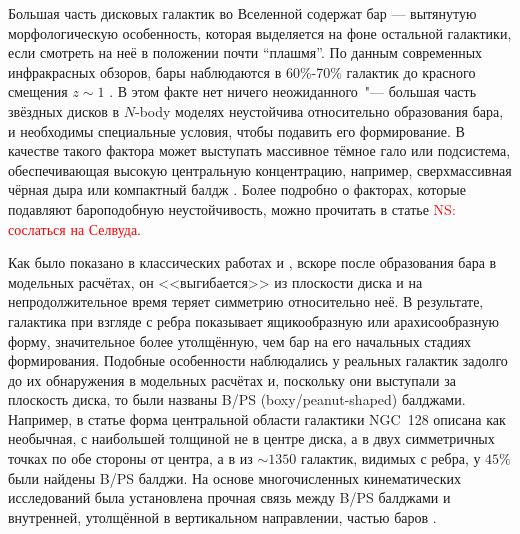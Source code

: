 \documentclass{trlnotes}
\begin{document}
Большая часть дисковых галактик во Вселенной содержат бар --- вытянутую морфологическую особенность, которая выделяется на 
фоне остальной галактики, если смотреть на неё в положении почти ``плашмя''. По данным современных инфракрасных 
обзоров, бары наблюдаются в 60\%-70\% галактик до красного смещения $z\sim 1$ \citep{marinova2007}.
В этом факте нет ничего неожиданного~"--- большая часть звёздных дисков в $N$-body моделях неустойчива
относительно образования бара, и необходимы специальные условия, чтобы подавить его формирование. В качестве такого фактора может выступать массивное тёмное гало или подсистема, обеспечивающая высокую
центральную концентрацию, например, сверхмассивная чёрная дыра \citep{shen2004} или компактный балдж
\citep{saha2018}. Более подробно о факторах, которые подавляют бароподобную неустойчивость, можно прочитать в статье \underdev \textcolor{red}{NS: сослаться на Селвуда}.

%
Как было показано в классических работах \citet{combes1981a} и \citet{raha1991}, вскоре после
образования бара в модельных расчётах, он <<выгибается>> из плоскости диска и на непродолжительное время теряет симметрию относительно неё. В
результате, галактика при взгляде с ребра показывает ящикообразную или арахисообразную форму, значительное
более утолщённую, чем бар на его начальных стадиях формирования. Подобные особенности наблюдались у реальных галактик задолго до их обнаружения в
модельных расчётах и, поскольку они  выступали за плоскость диска, то были названы B/PS (boxy/peanut-shaped) балджами. Например, в статье
\citet{burbidge1959} форма центральной области галактики NGC~128 описана как необычная, с наибольшей толщиной не в
центре диска, а в двух симметричных точках по обе стороны от центра, а в \citet{lutticke2000} из $\sim\!1350$ галактик, видимых с ребра, у $45\%$ были найдены B/PS балджи.
На основе многочисленных кинематических исследований была установлена прочная связь между B/PS балджами и внутренней, утолщённой в вертикальном направлении,  частью баров
\citep{kuijken1995,bureau1999,chung2004,bureau2006}. 
\end{document}

